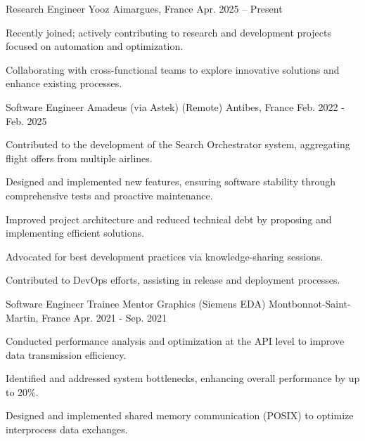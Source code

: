 
  \cventry
  {Research Engineer} %
  {Yooz} %
  {Aimargues, France} %
  {Apr. 2025 – Present} %
  {
    \begin{cvitems} %
      \item {Recently joined; actively contributing to research and development projects focused on automation and optimization.}
      \item {Collaborating with cross-functional teams to explore innovative solutions and enhance existing processes.}
    \end{cvitems}
  }


  \cventry
    {Software Engineer} %
    {Amadeus (via Astek)} %
    {(Remote) Antibes, France} %
    {Feb. 2022 - Feb. 2025} %
    {
      \begin{cvitems} %
        \item {Contributed to the development of the Search Orchestrator system, aggregating flight offers from multiple airlines.}
        \item {Designed and implemented new features, ensuring software stability through comprehensive tests and proactive maintenance.}
        \item {Improved project architecture and reduced technical debt by proposing and implementing efficient solutions.}
        \item {Advocated for best development practices via knowledge-sharing sessions.}
        \item {Contributed to DevOps efforts, assisting in release and deployment processes.}
      \end{cvitems}
    }

  \cventry
    {Software Engineer Trainee} %
    {Mentor Graphics (Siemens EDA)} %
    {Montbonnot-Saint-Martin, France} %
    {Apr. 2021 - Sep. 2021} %
    {
      \begin{cvitems} %
        \item {Conducted performance analysis and optimization at the API level to improve data transmission efficiency.}
        \item {Identified and addressed system bottlenecks, enhancing overall performance by up to 20\%.}
        \item {Designed and implemented shared memory communication (POSIX) to optimize interprocess data exchanges.}
      \end{cvitems}
    }

